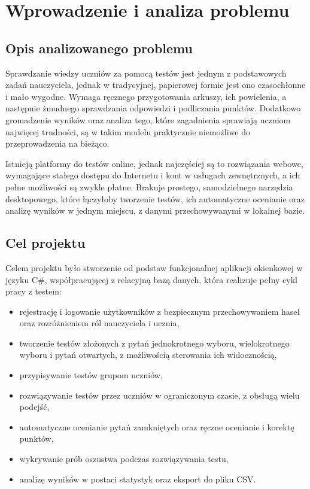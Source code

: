 ﻿\chapter{Wprowadzenie i analiza problemu}
\label{cha:wprowadzenie}

\section{Opis analizowanego problemu}
\label{sec:problem}

Sprawdzanie wiedzy uczniów za pomocą testów jest jednym z podstawowych zadań nauczyciela, jednak
w tradycyjnej, papierowej formie jest ono czasochłonne i mało wygodne. Wymaga ręcznego przygotowania
arkuszy, ich powielenia, a następnie żmudnego sprawdzania odpowiedzi i podliczania punktów. Dodatkowo
gromadzenie wyników oraz analiza tego, które zagadnienia sprawiają uczniom najwięcej trudności, są
w takim modelu praktycznie niemożliwe do przeprowadzenia na bieżąco.

Istnieją platformy do testów online, jednak najczęściej są to rozwiązania webowe, wymagające stałego
dostępu do Internetu i kont w usługach zewnętrznych, a ich pełne możliwości są zwykle płatne. Brakuje
prostego, samodzielnego narzędzia desktopowego, które łączyłoby tworzenie testów, ich automatyczne
ocenianie oraz analizę wyników w jednym miejscu, z danymi przechowywanymi w lokalnej bazie.

\section{Cel projektu}
\label{sec:cel}

Celem projektu było stworzenie od podstaw funkcjonalnej aplikacji okienkowej w języku C\#,
współpracującej z relacyjną bazą danych, która realizuje pełny cykl pracy z testem:

\begin{itemize}
  \item rejestrację i logowanie użytkowników z bezpiecznym przechowywaniem haseł oraz rozróżnieniem
        ról nauczyciela i ucznia,
  \item tworzenie testów złożonych z pytań jednokrotnego wyboru, wielokrotnego wyboru i pytań
        otwartych, z możliwością sterowania ich widocznością,
  \item przypisywanie testów grupom uczniów,
  \item rozwiązywanie testów przez uczniów w ograniczonym czasie, z obsługą wielu podejść,
  \item automatyczne ocenianie pytań zamkniętych oraz ręczne ocenianie i korektę punktów,
  \item wykrywanie prób oszustwa podczas rozwiązywania testu,
  \item analizę wyników w postaci statystyk oraz eksport do pliku CSV.
\end{itemize}

